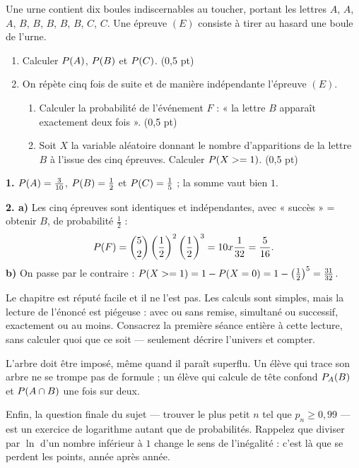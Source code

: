 \begin{commeaubac}
Une urne contient dix boules indiscernables au toucher, portant les lettres
$A$, $A$, $A$, $B$, $B$, $B$, $B$, $B$, $C$, $C$. Une épreuve $(E)$ consiste à
tirer au hasard une boule de l'urne.

\begin{enumerate}[label=\textbf{\arabic*.}, leftmargin=*, itemsep=0.25em]
  \item Calculer $\proba{A}$, $\proba{B}$ et $\proba{C}$.
        \hfill\textup{(0,5 pt)}
  \item On répète cinq fois de suite et de manière indépendante l'épreuve
        $(E)$.
        \begin{enumerate}[label=\textbf{\alph*)}, leftmargin=1.4em]
          \item Calculer la probabilité de l'événement $F$ : « la lettre $B$
                apparaît exactement deux fois ». \hfill\textup{(0,5 pt)}
          \item Soit $X$ la variable aléatoire donnant le nombre
                d'apparitions de la lettre $B$ à l'issue des cinq épreuves.
                Calculer $\proba{X \geq 1}$. \hfill\textup{(0,5 pt)}
        \end{enumerate}
\end{enumerate}
\end{commeaubac}

\begin{corrige}
\textbf{1.} $\proba{A} = \frac{3}{10}$, $\proba{B} = \frac12$ et
$\proba{C} = \frac15$ ; la somme vaut bien $1$.

\textbf{2. a)} Les cinq épreuves sont identiques et indépendantes, avec
« succès » = obtenir $B$, de probabilité $\frac12$ :
\[
  \proba{F} = \combi{2}{5}\left(\frac12\right)^{2}\left(\frac12\right)^{3}
  = 10 \times \frac{1}{32} = \frac{5}{16}.
\]
\textbf{b)} On passe par le contraire :
$\proba{X \geq 1} = 1-\proba{X = 0} = 1-\left(\frac12\right)^{5}
= \frac{31}{32}$.
\end{corrige}

\begin{notepourlaclasse}
Le chapitre est réputé facile et il ne l'est pas. Les calculs sont simples,
mais la lecture de l'énoncé est piégeuse : avec ou sans remise, simultané ou
successif, exactement ou au moins. Consacrez la première séance entière à
cette lecture, sans calculer quoi que ce soit — seulement décrire l'univers et
compter.

L'arbre doit être imposé, même quand il paraît superflu. Un élève qui trace
son arbre ne se trompe pas de formule ; un élève qui calcule de tête confond
$\probacond{B}{A}$ et $\proba{A \cap B}$ une fois sur deux.

Enfin, la question finale du sujet — trouver le plus petit $n$ tel que
$p_{n} \geq 0{,}99$ — est un exercice de logarithme autant que de
probabilités. Rappelez que diviser par $\ln$ d'un nombre inférieur à $1$
change le sens de l'inégalité : c'est là que se perdent les points, année
après année.
\end{notepourlaclasse}
